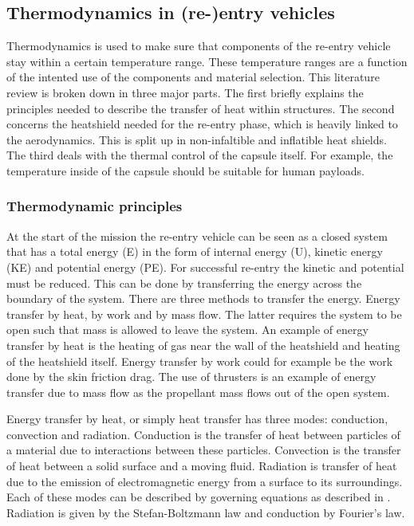 \subsection{Thermodynamics in (re-)entry vehicles}\label{sec:thermo}
Thermodynamics is used to make sure that components of the re-entry vehicle stay within a certain temperature range. These temperature ranges are a function of the intented use of the components and material selection. This literature review is broken down in three major parts. The first briefly explains the principles needed to describe the transfer of heat within structures. The second concerns the heatshield needed for the re-entry phase, which is heavily linked to the aerodynamics. This is split up in non-infaltible and inflatible heat shields. The third deals with the thermal control of the capsule itself. For example, the temperature inside of the capsule should be suitable for human payloads.

\subsubsection{Thermodynamic principles}
At the start of the mission the re-entry vehicle can be seen as a closed system that has a total energy (E) in the form of internal energy (U), kinetic energy (KE) and potential energy (PE). For successful re-entry the kinetic and potential must be reduced. This can be done by transferring the energy across the boundary of the system. There are three methods to transfer the energy. Energy transfer by heat, by work and by mass flow. The latter requires the system to be open such that mass is allowed to leave the system. \cite{Cengel2010} An example of energy transfer by heat is the heating of gas near the wall of the heatshield and heating of the heatshield itself. Energy transfer by work could for example be the work done by the skin friction drag. The use of thrusters is an example of energy transfer due to mass flow as the propellant mass flows out of the open system. 

Energy transfer by heat, or simply heat transfer has three modes: conduction, convection and radiation. Conduction is the transfer of heat between particles of a material due to interactions between these particles. Convection is the transfer of heat between a solid surface and a moving fluid. Radiation is transfer of heat due to the emission of electromagnetic energy from a surface to its surroundings. \cite{Cengel2010}\cite{Karam1998} Each of these modes can be described by governing equations as described in \cite{Holman2002}. Radiation is given by the Stefan-Boltzmann law and conduction by Fourier's law. \cite{Cengel2010}\cite{Holman2002}


